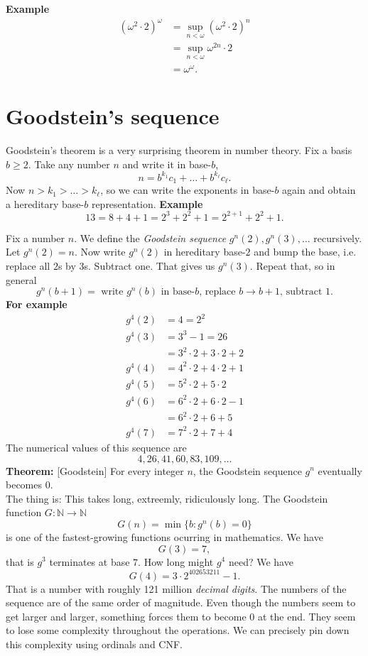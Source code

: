\textbf{Example}
\begin{align*}
(\omega^2 \cdot 2)^\omega &= \sup_{n<\omega} (\omega^2 \cdot 2)^n \\
&= \sup_{n < \omega} \omega^{2n}\cdot 2 \\
&= \omega^\omega. 
\end{align*}

\section{Goodstein's sequence}
Goodstein's theorem is a very surprising theorem in number theory. Fix a basis $b \geq 2$. Take any number $n$ and write it in base-$b$,
\[ n = b^{k_1}c_1 + \ldots + b^{k_\ell} c_\ell. \]
Now $n > k_1 > \ldots > k_\ell$, so we can write the exponents in base-$b$ again and obtain a hereditary base-$b$ representation. \textbf{Example}
\[ 13 = 8 + 4 + 1 = 2^3 + 2^2 + 1 = 2^{2+1} + 2^2 + 1. \]

Fix a number $n$. We define the \emph{Goodstein sequence} $g^n(2), g^n(3), \ldots$ recursively. Let $g^n(2) = n$. Now write $g^n(2)$ in hereditary base-$2$ and bump the base, i.e. replace all $2$s by $3$s. Subtract one. That gives us $g^n(3)$. Repeat that, so in general
\[ g^n(b+1) = \text{ write $g^n(b)$ in base-$b$, replace $b\to b+1$, subtract $1$}. \]
 \textbf{For example}
\begin{align*}
	g^4(2) &= 4 = 2^2 \\
	g^4(3) &= 3^3 - 1 = 26 \\
	       &= 3^2\cdot 2 + 3\cdot 2 + 2 \\
	g^4(4) &= 4^2 \cdot 2 + 4 \cdot 2 + 1 \\
	g^4(5) &= 5^2 \cdot 2 + 5 \cdot 2 \\
	g^4(6) &= 6^2 \cdot 2 + 6 \cdot 2 - 1 \\
	       &= 6^2 \cdot 2 + 6 + 5 \\
	g^4(7) &= 7^2 \cdot 2 + 7 + 4
\end{align*}
The numerical values of this sequence are
\[ 4, 26, 41, 60, 83, 109, \ldots \]
\textbf{Theorem: }[Goodstein] For every integer $n$, the Goodstein sequence $g^n$ eventually becomes $0$. \\

The thing is: This takes long, extreemly, ridiculously long. The Goodstein function $G : \mathbb N \to \mathbb N$
\[ G(n) = \min \{ b : g^n(b) = 0 \} \]
is one of the fastest-growing functions ocurring in mathematics. We have
\[ G(3) = 7, \] that is $g^3$ terminates at base $7$. How long might $g^4$ need? We have
\[ G(4) = 3\cdot 2^{402653211}-1. \]
That is a number with roughly 121 million \emph{decimal digits}. The numbers of the sequence are of the same order of magnitude. Even though the numbers seem to get larger and larger, something forces them to become 0 at the end. They seem to lose some complexity throughout the operations. We can precisely pin down this complexity using ordinals and CNF. \\

